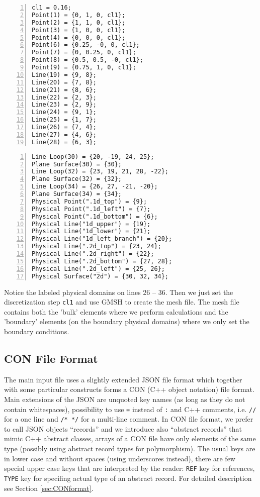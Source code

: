 \begin{multicols}{2}
{\small
\begin{Verbatim}[numbers=left]
cl1 = 0.16;
Point(1) = {0, 1, 0, cl1};
Point(2) = {1, 1, 0, cl1};
Point(3) = {1, 0, 0, cl1};
Point(4) = {0, 0, 0, cl1};
Point(6) = {0.25, -0, 0, cl1};
Point(7) = {0, 0.25, 0, cl1};
Point(8) = {0.5, 0.5, -0, cl1};
Point(9) = {0.75, 1, 0, cl1};
Line(19) = {9, 8};
Line(20) = {7, 8};
Line(21) = {8, 6};
Line(22) = {2, 3};
Line(23) = {2, 9};
Line(24) = {9, 1};
Line(25) = {1, 7};
Line(26) = {7, 4};
Line(27) = {4, 6};
Line(28) = {6, 3};
\end{Verbatim}
\columnbreak
\begin{Verbatim}[numbers=left, firstnumber=last]
Line Loop(30) = {20, -19, 24, 25};
Plane Surface(30) = {30};
Line Loop(32) = {23, 19, 21, 28, -22};
Plane Surface(32) = {32};
Line Loop(34) = {26, 27, -21, -20};
Plane Surface(34) = {34};
Physical Point(".1d_top") = {9};
Physical Point(".1d_left") = {7};
Physical Point(".1d_bottom") = {6};
Physical Line("1d_upper") = {19};
Physical Line("1d_lower") = {21};
Physical Line("1d_left_branch") = {20};
Physical Line(".2d_top") = {23, 24};
Physical Line(".2d_right") = {22};
Physical Line(".2d_bottom") = {27, 28};
Physical Line(".2d_left") = {25, 26};
Physical Surface("2d") = {30, 32, 34};
\end{Verbatim}
}
\end{multicols}

Notice the labeled physical domains on lines 26 -- 36. Then we just set the discretization step \verb'cl1' and use GMSH to create the mesh file.
The mesh file contains both the 'bulk' elements where we perform calculations and the 'boundary' elements (on the boundary physical domains) where we only set the boundary conditions.

\subsection{CON File Format}
The main input file uses a slightly extended JSON file format which together with some particular constructs forms a CON (C++ object notation) file format. 
Main extensions of the JSON are unquoted key names (as long as they do not contain whitespaces), possibility to use \verb'=' instead of \verb':' 
and C++ comments, i.e. \verb'//' for a one line and \verb'/* */' for a multi-line comment. In CON file format, we prefer to call JSON objects ``records'' and we introduce also ``abstract records''
that mimic C++ abstract classes, arrays of a CON file have only elements of the same type (possibly using abstract record types for polymorphism). 
The usual keys are in lower case and without spaces (using underscores instead),
there are few special upper case keys that are interpreted by the reader: \verb'REF' key for references, \verb'TYPE' key for specifing actual type of an abstract record.
For detailed description see Section \ref{sec:CONformat}.


